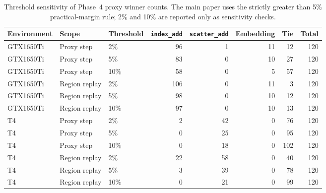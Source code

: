 \begin{table}[t]
\centering\fontsize{9}{11}\selectfont
\caption{Threshold sensitivity of Phase~4 proxy winner counts. The main paper uses the strictly greater than 5\% practical-margin rule; 2\% and 10\% are reported only as sensitivity checks.}
\label{tab:threshold-sensitivity-phase4}
\setlength{\tabcolsep}{3pt}
\renewcommand{\arraystretch}{1.12}
\begin{tabular*}{\textwidth}{@{\extracolsep{\fill}}lllrrrrr@{}}
\toprule
Environment & Scope & Threshold & \texttt{index\_add} & \texttt{scatter\_add} & Embedding & Tie & Total \\
\midrule
GTX1650Ti & Proxy step & 2\% & 96 & 1 & 11 & 12 & 120 \\
GTX1650Ti & Proxy step & 5\% & 83 & 0 & 10 & 27 & 120 \\
GTX1650Ti & Proxy step & 10\% & 58 & 0 & 5 & 57 & 120 \\
GTX1650Ti & Region replay & 2\% & 106 & 0 & 11 & 3 & 120 \\
GTX1650Ti & Region replay & 5\% & 98 & 0 & 10 & 12 & 120 \\
GTX1650Ti & Region replay & 10\% & 97 & 0 & 10 & 13 & 120 \\
T4 & Proxy step & 2\% & 2 & 42 & 0 & 76 & 120 \\
T4 & Proxy step & 5\% & 0 & 25 & 0 & 95 & 120 \\
T4 & Proxy step & 10\% & 0 & 18 & 0 & 102 & 120 \\
T4 & Region replay & 2\% & 22 & 58 & 0 & 40 & 120 \\
T4 & Region replay & 5\% & 3 & 39 & 0 & 78 & 120 \\
T4 & Region replay & 10\% & 0 & 21 & 0 & 99 & 120 \\
\bottomrule
\end{tabular*}
\end{table}
